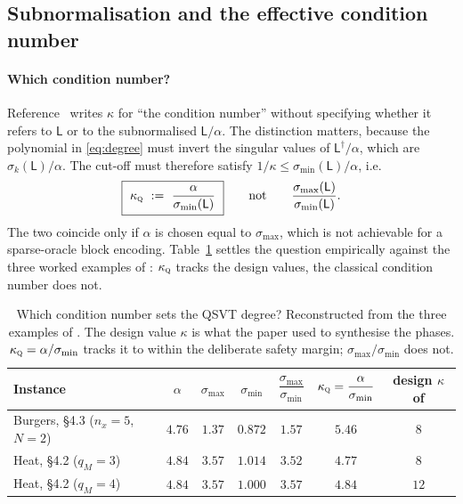 \documentclass[11pt,a4paper]{article}
\theoremstyle{plain}
\theoremstyle{definition}
\theoremstyle{remark}
\newcommand{\Lmat}{\mathsf{L}}
\newcommand{\kQ}{\kappa_{\textsc{q}}}
\begin{document}
\subsection{Subnormalisation and the effective condition number}
\label{sec:kappa}

\paragraph{Which condition number?}  Reference~\cite{Setty2026} writes $\kappa$
for ``the condition number'' without specifying whether it refers to $\Lmat$ or
to the subnormalised $\Lmat/\alpha$.  The distinction matters, because the
polynomial in \eqref{eq:degree} must invert the singular values of
$\Lmat^\dagger/\alpha$, which are $\sigma_k(\Lmat)/\alpha$.  The cut-off must
therefore satisfy $1/\kappa\le\sigma_{\min}(\Lmat)/\alpha$, i.e.
\begin{equation}
\boxed{\ \kQ\ :=\ \frac{\alpha}{\sigma_{\min}(\Lmat)}\ }
\qquad\text{not}\qquad
\frac{\sigma_{\max}(\Lmat)}{\sigma_{\min}(\Lmat)}.
\label{eq:kQ}
\end{equation}
The two coincide only if $\alpha$ is chosen equal to $\sigma_{\max}$, which is
not achievable for a sparse-oracle block encoding.  Table~\ref{tab:kappa}
settles the question empirically against the three worked examples of
\cite{Setty2026}: $\kQ$ tracks the design values, the classical condition number
does not.

\begin{table}[htbp]
\centering
\caption{Which condition number sets the QSVT degree?  Reconstructed from the
three examples of \cite{Setty2026}.  The design value $\kappa$ is what the paper
used to synthesise the phases.  $\kQ=\alpha/\sigma_{\min}$ tracks it to within
the deliberate safety margin; $\sigma_{\max}/\sigma_{\min}$ does not.}
\label{tab:kappa}
\small
\begin{tabular}{@{}lcccccc@{}}
\toprule
Instance & $\alpha$ & $\sigma_{\max}$ & $\sigma_{\min}$
& $\dfrac{\sigma_{\max}}{\sigma_{\min}}$ & $\kQ=\dfrac{\alpha}{\sigma_{\min}}$
& design $\kappa$ of \cite{Setty2026}\\
\midrule
Burgers, §4.3 ($n_x=5$, $N=2$)   & $4.76$ & $1.37$ & $0.872$ & $1.57$ & $5.46$ & $8$\\
Heat, §4.2 ($q_M=3$)             & $4.84$ & $3.57$ & $1.014$ & $3.52$ & $4.77$ & $8$\\
Heat, §4.2 ($q_M=4$)             & $4.84$ & $3.57$ & $1.000$ & $3.57$ & $4.84$ & $12$\\
\bottomrule
\end{tabular}
\end{table}
\end{document}
